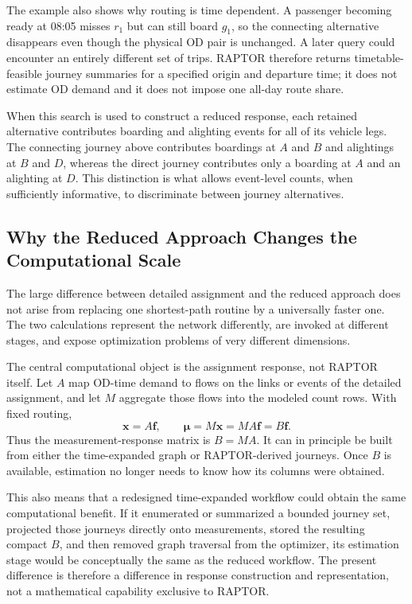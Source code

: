 The example also shows why routing is time dependent.  A passenger becoming
ready at 08:05 misses $r_1$ but can still board $g_1$, so the connecting
alternative disappears even though the physical OD pair is unchanged.  A
later query could encounter an entirely different set of trips.  RAPTOR
therefore returns timetable-feasible journey summaries for a specified origin
and departure time; it does not estimate OD demand and it does not impose one
all-day route share.

When this search is used to construct a reduced response, each retained
alternative contributes boarding and alighting events for all of its vehicle
legs.  The connecting journey above contributes boardings at $A$ and $B$ and
alightings at $B$ and $D$, whereas the direct journey contributes only a
boarding at $A$ and an alighting at $D$.  This distinction is what allows
event-level counts, when sufficiently informative, to discriminate between
journey alternatives.

\subsection{Why the Reduced Approach Changes the Computational Scale}
\label{sec:why-raptor-scales}

The large difference between detailed assignment and the reduced approach does
not arise from replacing one shortest-path routine by a universally faster
one. The two calculations represent the network differently, are invoked at
different stages, and expose optimization problems of very different
dimensions.

The central computational object is the assignment response, not RAPTOR
itself. Let $A$ map OD-time demand to flows on the links or events of the
detailed assignment, and let $M$ aggregate those flows into the modeled count
rows. With fixed routing,
\[
 \bm x=A\bm f,
 \qquad
 \bm\mu=M\bm x=MA\bm f=B\bm f.
\]
Thus the measurement-response matrix is $B=MA$. It can in principle be built
from either the time-expanded graph or RAPTOR-derived journeys. Once $B$ is
available, estimation no longer needs to know how its columns were obtained.

This also means that a redesigned time-expanded workflow could obtain the same
computational benefit. If it enumerated or summarized a bounded journey set,
projected those journeys directly onto measurements, stored the resulting
compact $B$, and then removed graph traversal from the optimizer, its
estimation stage would be conceptually the same as the reduced workflow. The
present difference is therefore a difference in response construction and
representation, not a mathematical capability exclusive to RAPTOR.

